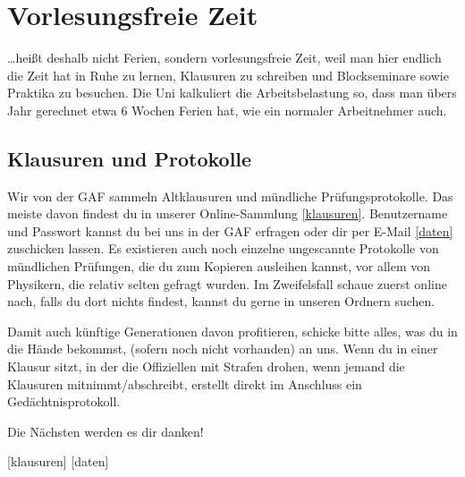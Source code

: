﻿\chapter{Vorlesungsfreie Zeit}

\ldots heißt deshalb nicht Ferien, sondern vorlesungsfreie Zeit, weil man hier
endlich die Zeit hat in Ruhe zu lernen, Klausuren zu schreiben und
Blockseminare sowie Praktika zu besuchen. Die Uni kalkuliert die
Arbeitsbelastung so, dass man übers Jahr gerechnet etwa 6 Wochen Ferien hat, wie
ein normaler Arbeitnehmer auch.

\section{Klausuren und Protokolle}
Wir von der GAF sammeln Altklausuren und mündliche Prüfungsprotokolle. Das
meiste davon findest du in unserer Online-Sammlung \ref{klausuren}.
Benutzername und Passwort kannst du bei uns in der GAF erfragen oder dir per
E-Mail \ref{daten} zuschicken lassen.  Es existieren auch noch einzelne
ungescannte Protokolle von mündlichen Prüfungen, die du zum Kopieren ausleihen
kannst, vor allem von Physikern, die relativ selten gefragt wurden. Im
Zweifelsfall schaue zuerst online nach, falls du dort nichts findest, kannst
du gerne in unseren Ordnern suchen.

Damit auch künftige Generationen davon profitieren, schicke bitte alles,
was du in die Hände bekommst, (sofern noch nicht vorhanden) an uns.
Wenn du in einer Klausur sitzt, in der die Offiziellen mit Strafen
drohen, wenn jemand die Klausuren mitnimmt/abschreibt, erstellt
direkt im Anschluss ein Gedächtnisprotokoll.

Die Nächsten werden es dir danken!

\begin{urlList}
	[klausuren]
	[daten]
\end{urlList}

